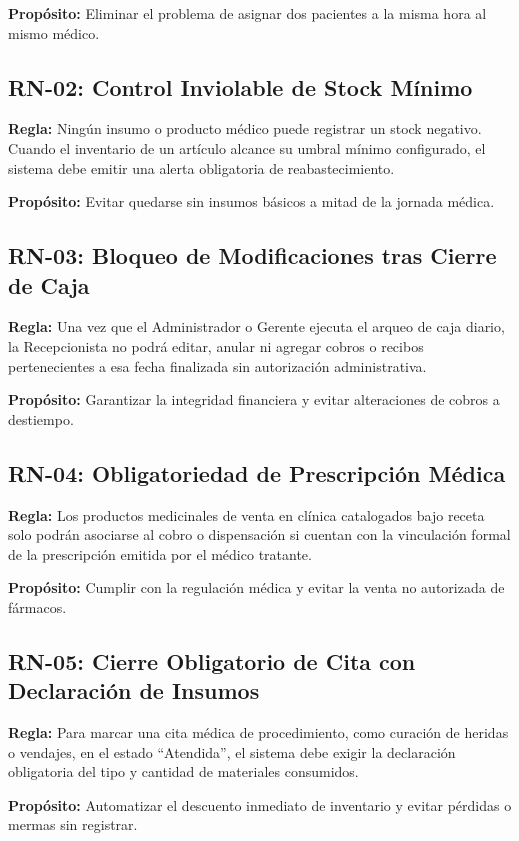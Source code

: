 \textbf{Propósito:} Eliminar el problema de asignar dos pacientes a la misma hora al mismo médico.

\subsection*{RN-02: Control Inviolable de Stock Mínimo}
\textbf{Regla:} Ningún insumo o producto médico puede registrar un stock negativo. Cuando el inventario de un artículo alcance su umbral mínimo configurado, el sistema debe emitir una alerta obligatoria de reabastecimiento.

\textbf{Propósito:} Evitar quedarse sin insumos básicos a mitad de la jornada médica.

\subsection*{RN-03: Bloqueo de Modificaciones tras Cierre de Caja}
\textbf{Regla:} Una vez que el Administrador o Gerente ejecuta el arqueo de caja diario, la Recepcionista no podrá editar, anular ni agregar cobros o recibos pertenecientes a esa fecha finalizada sin autorización administrativa.

\textbf{Propósito:} Garantizar la integridad financiera y evitar alteraciones de cobros a destiempo.

\subsection*{RN-04: Obligatoriedad de Prescripción Médica}
\textbf{Regla:} Los productos medicinales de venta en clínica catalogados bajo receta solo podrán asociarse al cobro o dispensación si cuentan con la vinculación formal de la prescripción emitida por el médico tratante.

\textbf{Propósito:} Cumplir con la regulación médica y evitar la venta no autorizada de fármacos.

\subsection*{RN-05: Cierre Obligatorio de Cita con Declaración de Insumos}
\textbf{Regla:} Para marcar una cita médica de procedimiento, como curación de heridas o vendajes, en el estado ``Atendida'', el sistema debe exigir la declaración obligatoria del tipo y cantidad de materiales consumidos.

\textbf{Propósito:} Automatizar el descuento inmediato de inventario y evitar pérdidas o mermas sin registrar.
